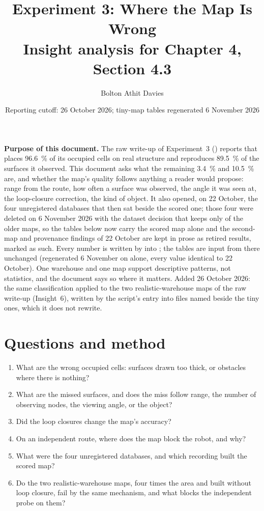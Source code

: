 \documentclass[11pt,a4paper,notitlepage]{report}
\title{Experiment 3: Where the Map Is Wrong\\
       \large Insight analysis for Chapter 4, Section 4.3}
\author{Bolton Athit Davies}
\date{Reporting cutoff: 26 October 2026; tiny-map tables regenerated 6 November 2026}
\begin{document}
\maketitle

\noindent\textbf{Purpose of this document.} The raw write-up of Experiment~3
() reports that  places
\SI{96.6}{\percent} of its occupied cells on real structure and reproduces
\SI{89.5}{\percent} of the surfaces it observed. This document asks what the
remaining \SI{3.4}{\percent} and \SI{10.5}{\percent} are, and whether the map's
quality follows anything a reader would propose: range from the route, how often
a surface was observed, the angle it was seen at, the loop-closure correction,
the kind of object. It also opened, on 22 October, the four unregistered
databases that then sat beside the scored one; those four were deleted on
6 November 2026 with the dataset decision that keeps only 
of the older maps, so the tables below now carry the scored map alone and the
second-map and provenance findings of 22 October are kept in prose as retired
results, marked as such. Every number is written by
 into
; the tables are input from
there unchanged (regenerated 6 November on  alone, every
 value identical to 22 October). One warehouse and one map
support descriptive patterns, not statistics, and the document says so where
it matters. Added 26
October 2026: the same classification applied to the two realistic-warehouse
maps of the raw write-up (Insight~6), written by the script's 
entry into files named  beside the tiny ones, which it does
not rewrite.

\section{Questions and method}

\begin{enumerate}[label=Q\arabic*.]
\item What are the wrong occupied cells: surfaces drawn too thick, or obstacles
      where there is nothing?
\item What are the missed surfaces, and does the miss follow range, the number
      of observing nodes, the viewing angle, or the object?
\item Did the loop closures change the map's accuracy?
\item On an independent route, where does the map block the robot, and why?
\item What were the four unregistered databases, and which recording built
      the scored map?
\item Do the two realistic-warehouse maps, four times the area and built
      without loop closure, fail by the same mechanism, and what blocks the
      independent probe on them?
\end{enumerate}
\end{document}
